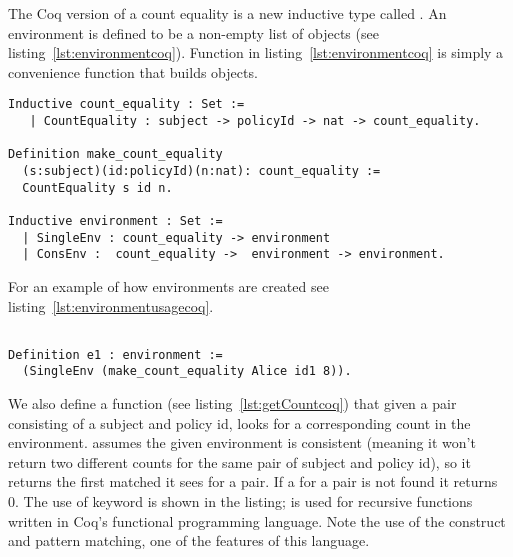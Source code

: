 The Coq version of a count equality is a new inductive type called . An environment is defined to be a non-empty list of  objects (see listing~\ref{lst:environmentcoq}). Function  in listing~\ref{lst:environmentcoq} is simply a convenience function that builds  objects. 

\begin{minipage}[c]{0.95\textwidth}
\begin{lstlisting}
Inductive count_equality : Set := 
   | CountEquality : subject -> policyId -> nat -> count_equality.

Definition make_count_equality
  (s:subject)(id:policyId)(n:nat): count_equality :=
  CountEquality s id n.
  
Inductive environment : Set := 
  | SingleEnv : count_equality -> environment
  | ConsEnv :  count_equality ->  environment -> environment.

\end{lstlisting}
\end{minipage}

For an example of how environments are created see listing~\ref{lst:environmentusagecoq}.

\begin{lstlisting}

Definition e1 : environment := 
  (SingleEnv (make_count_equality Alice id1 8)).

\end{lstlisting}
  

We also define a  function (see listing~\ref{lst:getCountcoq}) that given a pair consisting of a subject and policy id, looks for a corresponding count in the environment.  assumes the given environment is consistent (meaning it won't return two different counts for the same pair of subject and policy id), so it returns the first matched  it sees for a  pair. If a  for a  pair is not found it returns 0. The use of keyword  is shown in the listing;  is used for recursive functions written in Coq's functional programming language. Note the use of the  construct and pattern matching, one of the features of this language. 


